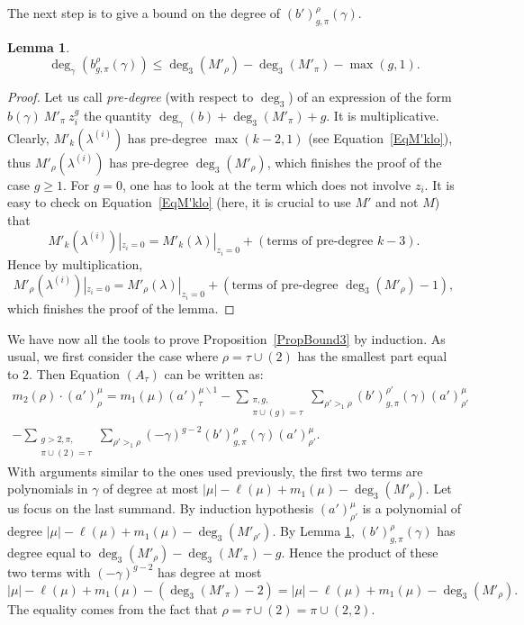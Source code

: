 \documentclass[11pt]{amsart}
\theoremstyle{plain}
\newtheorem{lemma}{Lemma}[section]
\theoremstyle{remark}
\newcommand{\lo}{\lambda^{(i)}}
\begin{document}
The next step is to give a bound on the degree of $(b')_{g,\pi}^\rho(\gamma)$.
\begin{lemma}
    \[ \deg_\gamma(b_{g,\pi}^\rho(\gamma)) \leq \deg_3(M'_\rho) - \deg_3(M'_\pi) - \max(g,1).\]
    \label{LemDeg3B'}
\end{lemma}
\begin{proof}
    Let us call \emph{pre-degree} (with respect to $\deg_3$)
    of an expression of the form $b(\gamma)\ M'_\pi\ z_i^g$
    the quantity $\deg_\gamma(b)+\deg_3(M'_\pi)+g$.
    It is multiplicative.
    Clearly, $M'_k(\lo)$ has pre-degree $\max(k-2,1)$ (see Equation~\eqref{EqM'klo}),
    thus $M'_\rho(\lo)$ has pre-degree $\deg_3(M'_\rho)$, which finishes the proof
    of the case $g \geq 1$.
    For $g=0$, one has to look at the term which does not involve $z_i$.
    It is easy to check on Equation~\eqref{EqM'klo} (here, it is crucial to use $M'$
    and not $M$) that
    \[M'_k(\lo)|_{z_i=0}=M'_k(\lambda)|_{z_i=0} + \left(\text{terms of pre-degree $k-3$}\right).\]
    Hence by multiplication, 
    \[M'_\rho(\lo)|_{z_i=0}=M'_\rho(\lambda)|_{z_i=0} + 
    \left(\text{terms of pre-degree }\deg_3(M'_\rho) - 1\right),\]
    which finishes the proof of the lemma.
\end{proof}

We have now all the tools to prove Proposition~\ref{PropBound3} by induction.
As usual, we first consider the case where $\rho=\tau \cup (2)$ has the smallest part equal to $2$.
Then Equation $(A_\tau)$ can be written as:
\begin{multline*}
    m_2(\rho) \cdot (a')^\mu_\rho = m_1(\mu) (a')^{\mu \backslash 1}_{\tau} 
    - \sum_{\substack{\pi,g, \\ \pi \cup (g) = \tau}} \sum_{\rho' >_1 \rho}
    (b')_{g,\pi}^{\rho'}(\gamma) (a')^\mu_{\rho'} \\
    -\sum_{\substack{g>2, \pi, \\ \pi \cup (2)=\tau}} \sum_{\rho' >_1 \rho}
    (-\gamma)^{g-2} (b')_{g,\pi}^\rho(\gamma)(a')^\mu_{\rho'}.
\end{multline*}
With arguments similar to the ones used previously,
the first two terms are polynomials in $\gamma$ of degree at most
$|\mu|-\ell(\mu)+m_1(\mu) - \deg_3(M'_{\rho})$.
Let us focus on the last summand.
By induction hypothesis $(a')^\mu_{\rho'}$ is a polynomial of degree 
$|\mu|-\ell(\mu)+m_1(\mu) - \deg_3(M'_{\rho'})$.
By Lemma \ref{LemDeg3B'}, $(b')_{g,\pi}^\rho(\gamma)$ has degree equal to
$\deg_3(M'_\rho) - \deg_3(M'_\pi) - g$.
Hence the product of these two terms with $(-\gamma)^{g-2}$ has degree at most
\[|\mu|-\ell(\mu)+m_1(\mu) - (\deg_3(M'_\pi) - 2) = |\mu|-\ell(\mu)+m_1(\mu) - \deg_3(M'_\rho).\]
The equality comes from the fact that $\rho=\tau \cup (2)=\pi \cup (2,2)$.
\end{document}
